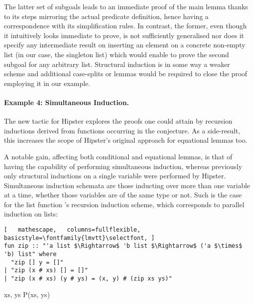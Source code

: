 The latter set of subgoals leads to an immediate proof of the main lemma thanks to its steps mirroring the actual predicate definition, hence having a correspondence with its simplification rules.
%
In contrast, the former, even though it intuitively looks immediate to prove, is not sufficiently generalised nor does it specify any intermediate result on inserting an element on a concrete non-empty list (in our case, the singleton list) which would enable to prove the second subgoal for any arbitrary list. Structural induction is in some way a weaker scheme and additional case-splits or lemmas would be required to close the proof employing it in our example.

\paragraph*{Example 4: Simultaneous Induction.}
The new tactic for Hipster explores the proofs one could attain by recursion inductions derived from functions occurring in the conjecture.
%
As a side-result, this increases the scope of Hipster's original approach for equational lemmas too.

A notable gain, affecting both conditional and equational lemmas, is that of having the capability of performing simultaneous induction, whereas previously only structural inductions on a single variable were performed by Hipster.
%
Simultaneous induction schemata are those inducting over more than one variable at a time, whether those variables are of the same type or not.
%
Such is the case for the list function 's recursion induction scheme, which corresponds to parallel induction on lists:

\begin{lstlisting}[   mathescape,   columns=fullflexible,   basicstyle=\fontfamily{lmvtt}\selectfont, ]
fun zip :: "'a list $\Rightarrow$ 'b list $\Rightarrow$ ('a $\times$ 'b) list" where
  "zip [] y = []"
| "zip (x # xs) [] = []"
| "zip (x # xs) (y # ys) = (x, y) # (zip xs ys)"
\end{lstlisting}

\vspace{2 mm}

  {\forall xs, \; ys \;\; P\;(xs,\; ys)}

